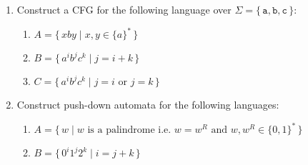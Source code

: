 \documentclass[11pt, article, oneside]{memoir}
\newcommand{\set}[1]{\{\, #1\, \}}
\begin{document}
\begin{enumerate}
    \item
        Construct a CFG for the following language over \(\Sigma = \set{\texttt{a}, \texttt{b}, \texttt{c}}\):
        \begin{enumerate}
            \item
                \(A = \set{xby \mid x, y \in \{a\}^*}\) 
            \item
                \(B = \set{ {a^i}{b^j}{c^k} \mid j = i + k}\)
            \item
                \(C = \set{ {a^i}{b^j}{c^k} \mid j = i \text{ or } j = k}\)
        \end{enumerate}
        
    \item
        Construct push-down automata for the following languages:
        \begin{enumerate}
            \item
                \(A = \set{w \mid w \text{ is a palindrome i.e. } w = w^R \text{ and } w, w^R \in \{0, 1\}^*}\) 
            \item
                \(B = \set{ {0^i}{1^j}{2^k} \mid i = j + k}\)
        \end{enumerate}
\end{enumerate}
\end{document}
